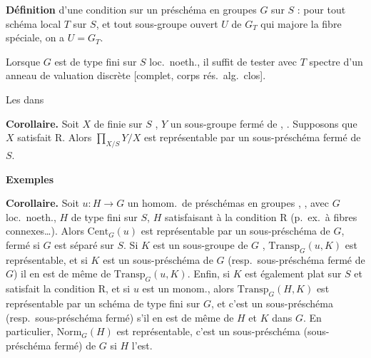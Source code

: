 \documentclass[11pt,a4paper]{article}
\begin{document}
\textbf{Définition} d'une condition sur un préschéma en groupes $G$  sur $S$ :  pour tout schéma local $T$ sur $S$, et tout sous-groupe ouvert  $U$ de $G_T$ qui majore la fibre spéciale, on a $U=G_T$.


Lorsque  $G$ est de type fini sur $S$ loc.\ noeth., il suffit de tester avec $T$ spectre d'un anneau de valuation discrète [complet, corps rés.\ alg.\ clos].

Les  dans

\textbf{Corollaire.} Soit  $X$ de    finie sur $S$ ,  $Y$ un sous-groupe fermé de , . Supposons que $X$ satisfait R. Alors $\prod_{X/S} Y/X$ est représentable par un sous-préschéma fermé de $S$.

\textbf{Exemples}

  


\textbf{Corollaire.} Soit $u\colon H\to G$ un homom.\ de préschémas en groupes ,  , avec $G$ loc.\ noeth., $H$ de type fini sur $S$,  $H$  satisfaisant à la condition R  (p.\ ex.\ à fibres connexes…). Alors $\mathrm{Cent}_G(u)$ est représentable par un sous-préschéma  de $G$,  fermé si $G$ est séparé sur $S$. Si $K$ est un sous-groupe de $G$ ,  $\mathrm{Transp}_G(u,K)$ est représentable, et si $K$ est un sous-préschéma de $G$ (resp.\ sous-préschéma fermé de $G$) il en est de même de $\mathrm{Transp}_G(u,K)$. Enfin, si  $K$ est également plat sur $S$ et satisfait la condition R, et si $u$ est un monom., alors   $\mathrm{Transp}_G(H,K)$ est représentable par un schéma de type fini sur $G$, et c'est un sous-préschéma (resp.\ sous-préschéma fermé) s'il en est de même de $H$ et $K$ dans $G$. En particulier, $\mathrm{Norm}_G(H)$ est représentable, c'est un sous-préschéma (sous-préschéma fermé) de $G$ si $H$ l'est.
\end{document}
